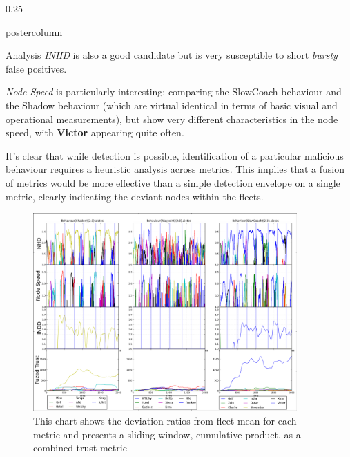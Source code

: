 \documentclass[final,hyperref={pdfpagelabels=false}]{beamer}
\def\colwidth{0.25\linewidth}
\begin{document}
\begin{frame}[fragile]
\begin{columns}[t]
\begin{column}{\colwidth}
\begin{beamercolorbox}[center,wd=\textwidth]{postercolumn}
\begin{minipage}[T]{.98\textwidth}
{\begin{block}{Analysis}
              \emph{INHD} is also a good candidate but is very susceptible to short \emph{bursty} false positives.

              \emph{Node Speed} is particularly interesting; comparing the SlowCoach behaviour and the Shadow behaviour (which are virtual identical in terms of basic visual and operational measurements), but show very different characteristics in the node speed, with \textbf{Victor} appearing quite often.

              \vspace{\baselineskip}

              It's clear that while detection is possible, identification of a particular malicious behaviour requires a heuristic analysis across metrics.
              This implies that a fusion of metrics would be more effective than a simple detection envelope on a single metric, clearly indicating the deviant nodes within the fleets.

              \begin{figure}
                \includegraphics[width=0.9\textwidth]{figures/Behaviour Fusion}
                \caption{This chart shows the deviation ratios from fleet-mean for each metric and presents a sliding-window, cumulative product, as a combined trust metric}
                \label{fig:Behaviour Fusion}
              \end{figure}

            \end{block}
        
          }
        \end{minipage}
      \end{beamercolorbox}
    \end{column}


\end{columns}
\end{frame}
\end{document}
